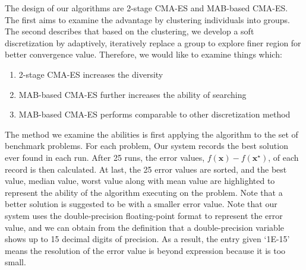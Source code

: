 The design of our algorithms are 2-stage CMA-ES and MAB-based CMA-ES.
The first aims to examine the advantage by clustering individuals
into groups.
The second describes that based on the clustering, we develop a soft
discretization by adaptively, iteratively replace a group to explore finer region
for better convergence value.
Therefore, we would like to examine things which:
\begin{enumerate}
  \item{2-stage CMA-ES increases the diversity}
  \item{MAB-based CMA-ES further increases the ability of searching}
  \item{MAB-based CMA-ES performs comparable to other discretization
    method}
  \end{enumerate}
The method we examine the abilities is first applying the algorithm to
the set of benchmark problems. For each problem, Our system records
the best solution ever found in each run. After 25 runs, the error
values, $f(\mathbf{x}) -f(\mathbf{x^\star})$, of each record is then
calculated.
At last, the 25 error values are sorted, and the best value, median
value, worst value along with mean value are highlighted to represent
the ability of the algorithm executing on the problem. Note that a
better solution is suggested to be with a smaller error value.
Note that our system uses the double-precision floating-point format to
represent the error value, and we can obtain from the definition that a
double-precision variable shows up to 15 decimal digits of precision.
As a result, the entry given `1E-15' means the resolution of the error
value is beyond expression because it is too small.   


